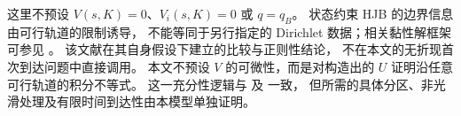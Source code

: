 这里不预设 $V(s,K)=0$、$V_i(s,K)=0$ 或 $q=q_B$。
状态约束 HJB 的边界信息由可行轨道的限制诱导，
不能等同于另行指定的 Dirichlet 数据；相关黏性解框架可参见
\citet{Soner1986}。
该文献在其自身假设下建立的比较与正则性结论，
不在本文的无折现首次到达问题中直接调用。
本文不预设 $V$ 的可微性，而是对构造出的 $U$
证明沿任意可行轨道的积分不等式。
这一充分性逻辑与 \citet[附录A.1]{MicloSpiroWeibull2022}
及 \citet[\S5.1.4]{Liberzon2012} 一致，
但所需的具体分区、非光滑处理及有限时间到达性由本模型单独证明。
